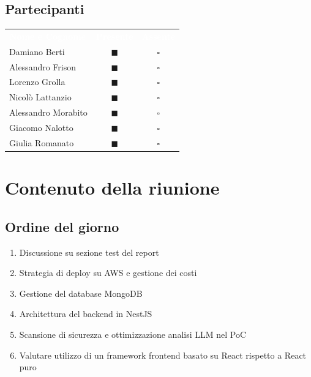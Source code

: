 \documentclass[a4paper, 11pt]{article}
\begin{document}
\subsection{Partecipanti}
\begin{center}
    \begin{tabular}{>{\raggedright\arraybackslash}p{6cm} c c}
        \rowcolor{AccentColor}
        \textcolor{white}{\textbf{Nome e Cognome}} & 
        \textcolor{white}{\textbf{Presente}} & 
        \textcolor{white}{\textbf{Assente}} \\
        
        Damiano Berti     & \textcolor{AccentColor}{$\blacksquare$}    & $\square$        \\
        Alessandro Frison     & \textcolor{AccentColor}{$\blacksquare$}    & $\square$        \\
        Lorenzo Grolla     & \textcolor{AccentColor}{$\blacksquare$}    & $\square$        \\
        Nicolò Lattanzio    & \textcolor{AccentColor}{$\blacksquare$}    & $\square$        \\
        Alessandro Morabito   & \textcolor{AccentColor}{$\blacksquare$}    & $\square$        \\
        Giacomo Nalotto   & \textcolor{AccentColor}{$\blacksquare$}    & $\square$        \\
        Giulia Romanato   & \textcolor{AccentColor}{$\blacksquare$}    & $\square$        \\
    \end{tabular}
\end{center}

\section{Contenuto della riunione}

\subsection{Ordine del giorno}
\begin{enumerate}
    \item Discussione su sezione test del report
    \item Strategia di deploy su AWS e gestione dei costi
    \item Gestione del database MongoDB
    \item Architettura del backend in NestJS
    \item Scansione di sicurezza e ottimizzazione analisi LLM nel PoC
    \item Valutare utilizzo di un framework frontend basato su React rispetto a React puro
\end{enumerate}
\end{document}
